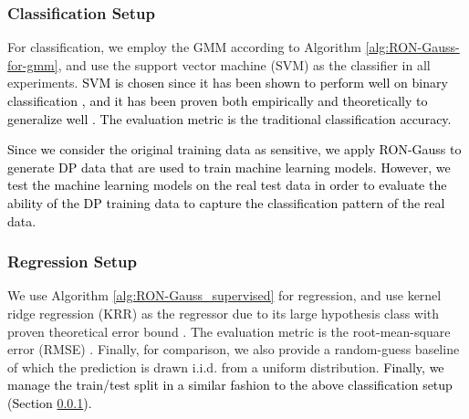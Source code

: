 \documentclass[USenglish,oneside,twocolumn]{article}
\theoremstyle{definition}
\theoremstyle{remark}
\theoremstyle{plain}
\theoremstyle{plain}
\newcommand{\chang}{\textcolor{black}}
\begin{document}
 \vspace{-1em}
\subsubsection{Classification Setup} \label{subsubsec:clf_setup}
 \vspace{-1em}
For classification, we employ the GMM according to Algorithm \ref{alg:RON-Gauss-for-gmm},
and use the support vector machine (SVM) \cite{RefWorks:359,RefWorks:231}
as the classifier in all experiments. \chang{SVM is chosen since it has been shown to perform well on binary classification \cite{RefWorks:199,RefWorks:430,byun2002applications}, and it has been proven \textendash{} both empirically and theoretically \textendash{} to generalize well \cite{RefWorks:376,RefWorks:199}. The evaluation metric is the traditional classification accuracy.
}

\chang{Since we consider the original training data as sensitive, we apply RON-Gauss to generate DP data that are used to train machine learning models. However, we test the machine learning models on the real test data in order to evaluate the ability of the DP training data to capture the classification pattern of the real data.}



\vspace{-1em}
\subsubsection{Regression Setup}
\vspace{-1em}
We use Algorithm \ref{alg:RON-Gauss_supervised} for regression, and
use kernel ridge regression (KRR) \cite{RefWorks:33,RefWorks:231}
as the regressor due to its large hypothesis class with proven theoretical error bound \cite{RefWorks:199,zhang2005learning}. The evaluation metric is the root-mean-square
error (RMSE) \cite{RefWorks:33,RefWorks:225}. Finally, for comparison, we also provide a random-guess baseline of which the prediction is drawn i.i.d. from a uniform distribution.
\chang{Finally, we manage the train/test split in a similar fashion to the above classification setup (Section \ref{subsubsec:clf_setup}).}

\vspace{-0.8em}
\end{document}
